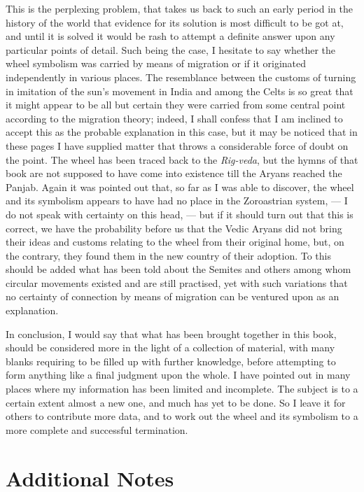 \documentclass[a4paper, 11pt, oneside, polutonikogreek, english]{article}
\begin{document}
This is the perplexing problem, that takes us back to such an early period in the history of the world that evidence for its solution is most difficult to be got at, and until it is solved it would be rash to attempt a definite answer upon any particular points of detail. Such being the case, I hesitate to say whether the wheel symbolism was carried by means of migration or if it originated independently in various places. The resemblance between the customs of turning in imitation of the sun's movement in India and among the Celts is so great that it might appear to be all but certain they were carried from some central point according to the migration theory; indeed, I shall confess that I am inclined to accept this as the probable explanation in this case, but it may be noticed that in these pages I have supplied matter that throws a considerable force of doubt on the point. The wheel has been traced back to the \emph{Rig-veda}, but the hymns of that book are not supposed to have come into existence till the Aryans reached the Panjab. Again it was pointed out that, so far as I was able to discover, the wheel and its symbolism appears to have had no place in the Zoroastrian system, --- I do not speak with certainty on this head, --- but if it should turn out that this is correct, we have the probability before us that the Vedic Aryans did not bring their ideas and customs relating to the wheel from their original home, but, on the contrary, they found them in the new country of their adoption. To this should be added what has been told about the Semites and others among whom circular movements existed and are still practised, yet with such variations that no certainty of connection by means of migration can be ventured upon as an explanation.

In conclusion, I would say that what has been brought together in this book, should be considered more in the light of a collection of material, with many blanks requiring to be filled up with further knowledge, before attempting to form anything like a final judgment upon the whole. I have pointed out in many places where my information has been limited and incomplete. The subject is to a certain extent almost a new one, and much has yet to be done. So I leave it for others to contribute more data, and to work out the wheel and its symbolism to a more complete and successful termination.

\section{Additional Notes}
\end{document}
